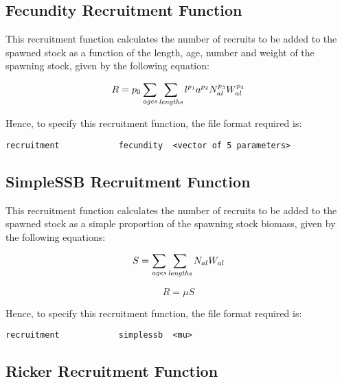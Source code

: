\documentclass[]{book}
\begin{document}
\hypertarget{fecundity-recruitment-function}{%
\subsection{Fecundity Recruitment Function}\label{fecundity-recruitment-function}}

This recruitment function calculates the number of recruits to be added
to the spawned stock as a function of the length, age, number and weight
of the spawning stock, given by the following equation:

\begin{equation}
\label{eq:rec1}
R = p_{0} \sum_{\it ages}\sum_{\it lengths} l ^{p_{1}} a ^{p_{2}} N_{al} ^{p_{3}} W_{al} ^{p_{4}}\end{equation}

Hence, to specify this recruitment function, the file format required
is:

\begin{verbatim}
recruitment            fecundity  <vector of 5 parameters>
\end{verbatim}

\hypertarget{simplessb-recruitment-function}{%
\subsection{SimpleSSB Recruitment Function}\label{simplessb-recruitment-function}}

This recruitment function calculates the number of recruits to be added
to the spawned stock as a simple proportion of the spawning stock
biomass, given by the following equations:

\begin{equation}
\label{eq:ssb}
S = \sum_{\it ages}\sum_{\it lengths} N_{al} W_{al}\end{equation}

\begin{equation}
\label{eq:rec2}
R = \mu S\end{equation}

Hence, to specify this recruitment function, the file format required
is:

\begin{verbatim}
recruitment            simplessb  <mu>
\end{verbatim}

\hypertarget{ricker-recruitment-function}{%
\subsection{Ricker Recruitment Function}\label{ricker-recruitment-function}}
\end{document}
